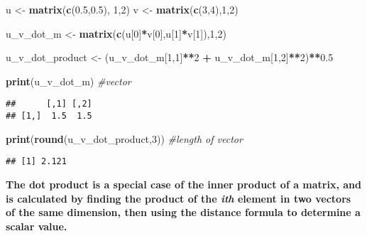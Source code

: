 \documentclass[
]{article}
\newenvironment{Shaded}{\begin{snugshade}}{\end{snugshade}}
\newcommand{\CommentTok}[1]{\textcolor[rgb]{0.56,0.35,0.01}{\textit{#1}}}
\newcommand{\DecValTok}[1]{\textcolor[rgb]{0.00,0.00,0.81}{#1}}
\newcommand{\FloatTok}[1]{\textcolor[rgb]{0.00,0.00,0.81}{#1}}
\newcommand{\KeywordTok}[1]{\textcolor[rgb]{0.13,0.29,0.53}{\textbf{#1}}}
\newcommand{\NormalTok}[1]{#1}
\newcommand{\OperatorTok}[1]{\textcolor[rgb]{0.81,0.36,0.00}{\textbf{#1}}}
\newcommand{\StringTok}[1]{\textcolor[rgb]{0.31,0.60,0.02}{#1}}
\begin{document}
\begin{Shaded}
\begin{Highlighting}[]
\NormalTok{u \textless{}{-}}\StringTok{ }\KeywordTok{matrix}\NormalTok{(}\KeywordTok{c}\NormalTok{(}\FloatTok{0.5}\NormalTok{,}\FloatTok{0.5}\NormalTok{), }\DecValTok{1}\NormalTok{,}\DecValTok{2}\NormalTok{)}
\NormalTok{v \textless{}{-}}\StringTok{ }\KeywordTok{matrix}\NormalTok{(}\KeywordTok{c}\NormalTok{(}\DecValTok{3}\NormalTok{,}\DecValTok{4}\NormalTok{),}\DecValTok{1}\NormalTok{,}\DecValTok{2}\NormalTok{)}

\NormalTok{u\_v\_dot\_m \textless{}{-}}\StringTok{ }\KeywordTok{matrix}\NormalTok{(}\KeywordTok{c}\NormalTok{(u[}\DecValTok{0}\NormalTok{]}\OperatorTok{*}\NormalTok{v[}\DecValTok{0}\NormalTok{],u[}\DecValTok{1}\NormalTok{]}\OperatorTok{*}\NormalTok{v[}\DecValTok{1}\NormalTok{]),}\DecValTok{1}\NormalTok{,}\DecValTok{2}\NormalTok{)}

\NormalTok{u\_v\_dot\_product \textless{}{-}}\StringTok{ }\NormalTok{(u\_v\_dot\_m[}\DecValTok{1}\NormalTok{,}\DecValTok{1}\NormalTok{]}\OperatorTok{**}\DecValTok{2} \OperatorTok{+}\StringTok{ }\NormalTok{u\_v\_dot\_m[}\DecValTok{1}\NormalTok{,}\DecValTok{2}\NormalTok{]}\OperatorTok{**}\DecValTok{2}\NormalTok{)}\OperatorTok{**}\FloatTok{0.5}

\KeywordTok{print}\NormalTok{(u\_v\_dot\_m) }\CommentTok{\#vector}
\end{Highlighting}
\end{Shaded}

\begin{verbatim}
##      [,1] [,2]
## [1,]  1.5  1.5
\end{verbatim}

\begin{Shaded}
\begin{Highlighting}[]
\KeywordTok{print}\NormalTok{(}\KeywordTok{round}\NormalTok{(u\_v\_dot\_product,}\DecValTok{3}\NormalTok{)) }\CommentTok{\#length of vector}
\end{Highlighting}
\end{Shaded}

\begin{verbatim}
## [1] 2.121
\end{verbatim}

\textbf{The dot product is a special case of the inner product of a
matrix, and is calculated by finding the product of the \emph{ith}
element in two vectors of the same dimension, then using the distance
formula to determine a scalar value.}
\end{document}
